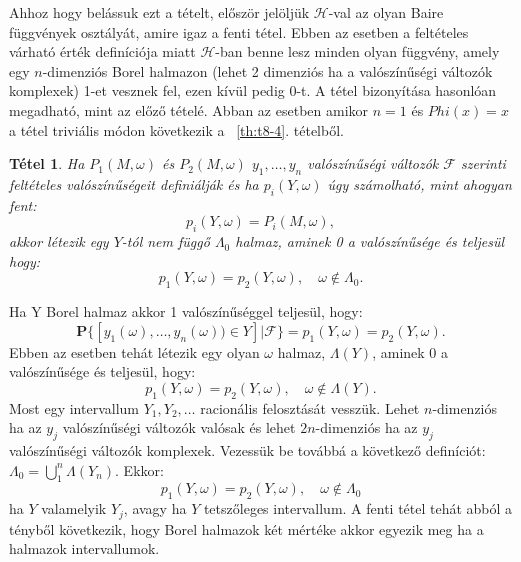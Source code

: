 \documentclass{article}
\newtheorem{theorem}{Tétel}
\begin{document}
Ahhoz hogy belássuk ezt a tételt, először jelöljük $\mathscr{H}$-val az olyan Baire függvények osztályát, amire igaz a fenti tétel. Ebben az esetben a feltételes várható érték definíciója miatt $\mathscr{H}$-ban benne lesz minden olyan függvény, amely egy $n$-dimenziós Borel halmazon (lehet 2 dimenziós ha a valószínűségi változók komplexek) 1-et vesznek fel, ezen kívül pedig 0-t. A tétel bizonyítása hasonlóan megadható, mint az előző tételé. Abban az esetben amikor $n=1$ és $Phi(x)=x$ a tétel triviális módon következik a ~\ref{th:t8-4}. tételből.
\begin{theorem}\label{th:t9-3}
	Ha $P_1(M,\omega)$ és $P_2(M,\omega)$ $y_1,\ldots,y_n$ valószínűségi változók $\mathscr{F}$ szerinti feltételes valószínűségeit definiálják és ha $p_i(Y,\omega)$ úgy számolható, mint ahogyan fent:
\begin{equation}
	p_i(Y,\omega) = P_i(M,\omega),
\end{equation}
akkor létezik egy $Y$-tól nem függő $\Lambda_0$ halmaz, aminek 0 a valószínűsége és teljesül hogy:
\begin{equation}
	p_1(Y,\omega) = p_2(Y,\omega), \quad \omega \notin \Lambda_0 .
\end{equation}
\end{theorem}
Ha Y Borel halmaz akkor 1 valószínűséggel teljesül, hogy:
\[
	\mathrm{\textbf{P}}\{ [y_1(\omega),\ldots,y_n(\omega)) \in Y ] | \mathscr{F} \} = p_1(Y,\omega) = p_2(Y,\omega) .
\]
Ebben az esetben tehát létezik egy olyan $\omega$ halmaz, $\Lambda(Y)$, aminek 0 a valószínűsége és teljesül, hogy:
\[
 p_1(Y,\omega) = p_2(Y,\omega), \quad \omega \notin \Lambda(Y).
\]
Most egy intervallum $Y_1,Y_2,\ldots$ racionális felosztását vesszük. Lehet $n$-dimenziós ha az $y_j$ valószínűségi változók valósak és lehet $2n$-dimenziós ha az $y_j$ valószínűségi változók komplexek. Vezessük be továbbá a következő definíciót: $\Lambda_0 = \bigcup^{n}_1 \Lambda(Y_n)$. Ekkor:
\[
	p_1(Y,\omega) = p_2(Y,\omega), \quad \omega \notin \Lambda_0
\]
ha $Y$ valamelyik $Y_j$, avagy ha $Y$ tetszőleges intervallum. A fenti tétel tehát abból a tényből következik, hogy Borel halmazok két mértéke akkor egyezik meg ha a halmazok intervallumok.
\end{document}
